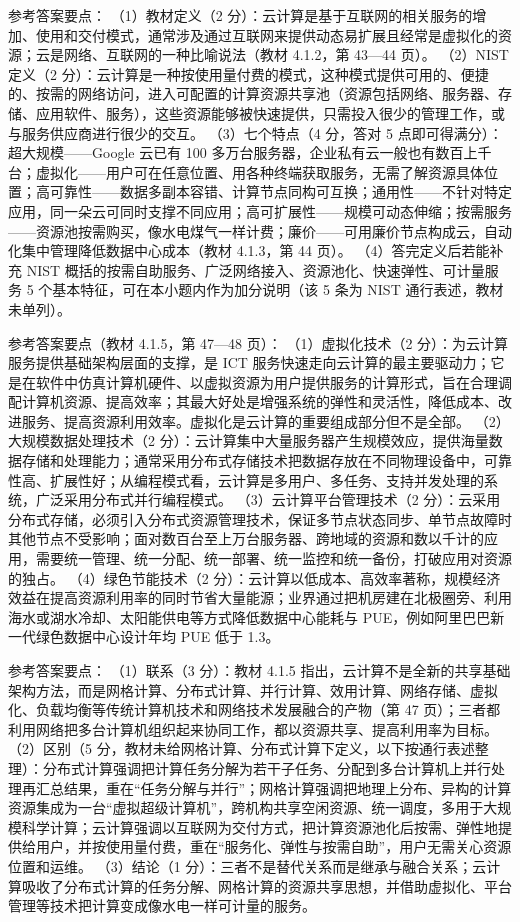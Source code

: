 \documentclass[a4paper,11pt]{article}
\begin{document}

\q 参考答案要点：
（1）教材定义（2 分）：云计算是基于互联网的相关服务的增加、使用和交付模式，通常涉及通过互联网来提供动态易扩展且经常是虚拟化的资源；云是网络、互联网的一种比喻说法（教材 4.1.2，第 43—44 页）。
（2）NIST 定义（2 分）：云计算是一种按使用量付费的模式，这种模式提供可用的、便捷的、按需的网络访问，进入可配置的计算资源共享池（资源包括网络、服务器、存储、应用软件、服务），这些资源能够被快速提供，只需投入很少的管理工作，或与服务供应商进行很少的交互。
（3）七个特点（4 分，答对 5 点即可得满分）：超大规模——Google 云已有 100 多万台服务器，企业私有云一般也有数百上千台；虚拟化——用户可在任意位置、用各种终端获取服务，无需了解资源具体位置；高可靠性——数据多副本容错、计算节点同构可互换；通用性——不针对特定应用，同一朵云可同时支撑不同应用；高可扩展性——规模可动态伸缩；按需服务——资源池按需购买，像水电煤气一样计费；廉价——可用廉价节点构成云，自动化集中管理降低数据中心成本（教材 4.1.3，第 44 页）。
（4）答完定义后若能补充 NIST 概括的按需自助服务、广泛网络接入、资源池化、快速弹性、可计量服务 5 个基本特征，可在本小题内作为加分说明（该 5 条为 NIST 通行表述，教材未单列）。

\q 参考答案要点（教材 4.1.5，第 47—48 页）：
（1）虚拟化技术（2 分）：为云计算服务提供基础架构层面的支撑，是 ICT 服务快速走向云计算的最主要驱动力；它是在软件中仿真计算机硬件、以虚拟资源为用户提供服务的计算形式，旨在合理调配计算机资源、提高效率；其最大好处是增强系统的弹性和灵活性，降低成本、改进服务、提高资源利用效率。虚拟化是云计算的重要组成部分但不是全部。
（2）大规模数据处理技术（2 分）：云计算集中大量服务器产生规模效应，提供海量数据存储和处理能力；通常采用分布式存储技术把数据存放在不同物理设备中，可靠性高、扩展性好；从编程模式看，云计算是多用户、多任务、支持并发处理的系统，广泛采用分布式并行编程模式。
（3）云计算平台管理技术（2 分）：云采用分布式存储，必须引入分布式资源管理技术，保证多节点状态同步、单节点故障时其他节点不受影响；面对数百台至上万台服务器、跨地域的资源和数以千计的应用，需要统一管理、统一分配、统一部署、统一监控和统一备份，打破应用对资源的独占。
（4）绿色节能技术（2 分）：云计算以低成本、高效率著称，规模经济效益在提高资源利用率的同时节省大量能源；业界通过把机房建在北极圈旁、利用海水或湖水冷却、太阳能供电等方式降低数据中心能耗与 PUE，例如阿里巴巴新一代绿色数据中心设计年均 PUE 低于 1.3。

\q 参考答案要点：
（1）联系（3 分）：教材 4.1.5 指出，云计算不是全新的共享基础架构方法，而是网格计算、分布式计算、并行计算、效用计算、网络存储、虚拟化、负载均衡等传统计算机技术和网络技术发展融合的产物（第 47 页）；三者都利用网络把多台计算机组织起来协同工作，都以资源共享、提高利用率为目标。
（2）区别（5 分，教材未给网格计算、分布式计算下定义，以下按通行表述整理）：分布式计算强调把计算任务分解为若干子任务、分配到多台计算机上并行处理再汇总结果，重在“任务分解与并行”；网格计算强调把地理上分布、异构的计算资源集成为一台“虚拟超级计算机”，跨机构共享空闲资源、统一调度，多用于大规模科学计算；云计算强调以互联网为交付方式，把计算资源池化后按需、弹性地提供给用户，并按使用量付费，重在“服务化、弹性与按需自助”，用户无需关心资源位置和运维。
（3）结论（1 分）：三者不是替代关系而是继承与融合关系；云计算吸收了分布式计算的任务分解、网格计算的资源共享思想，并借助虚拟化、平台管理等技术把计算变成像水电一样可计量的服务。
\end{document}
